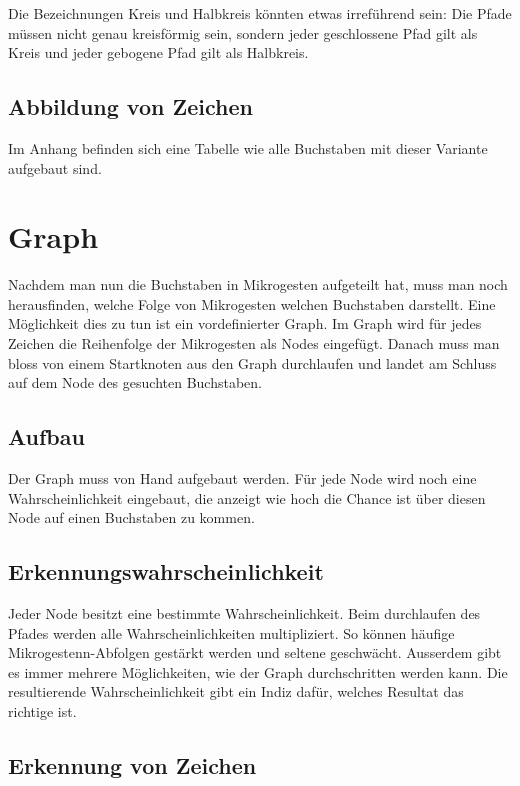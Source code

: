 Die Bezeichnungen Kreis und Halbkreis könnten etwas irreführend sein: Die Pfade müssen nicht genau kreisförmig sein, sondern jeder geschlossene Pfad gilt als Kreis und jeder gebogene Pfad gilt als Halbkreis.

\section{Abbildung von Zeichen}

Im Anhang befinden sich eine Tabelle wie alle Buchstaben mit dieser Variante aufgebaut sind.

\chapter{Graph}
Nachdem man nun die Buchstaben in Mikrogesten aufgeteilt hat, muss man noch herausfinden, welche Folge von Mikrogesten welchen Buchstaben darstellt. Eine Möglichkeit dies zu tun ist ein vordefinierter Graph. Im Graph wird für jedes Zeichen die Reihenfolge der Mikrogesten als Nodes eingefügt. Danach muss man bloss von einem Startknoten aus den Graph durchlaufen und landet am Schluss auf dem Node des gesuchten Buchstaben.


\section{Aufbau}
Der Graph muss von Hand aufgebaut werden. Für jede Node wird noch eine Wahrscheinlichkeit eingebaut, die anzeigt wie hoch die Chance ist über diesen Node auf einen Buchstaben zu kommen.

\section{Erkennungswahrscheinlichkeit}
Jeder Node besitzt eine bestimmte Wahrscheinlichkeit. Beim durchlaufen des Pfades werden alle Wahrscheinlichkeiten multipliziert. So können häufige Mikrogestenn-Abfolgen gestärkt werden und seltene geschwächt. Ausserdem gibt es immer mehrere Möglichkeiten, wie der Graph durchschritten werden kann. Die resultierende Wahrscheinlichkeit gibt ein Indiz dafür, welches Resultat das richtige ist.

\section{Erkennung von Zeichen}